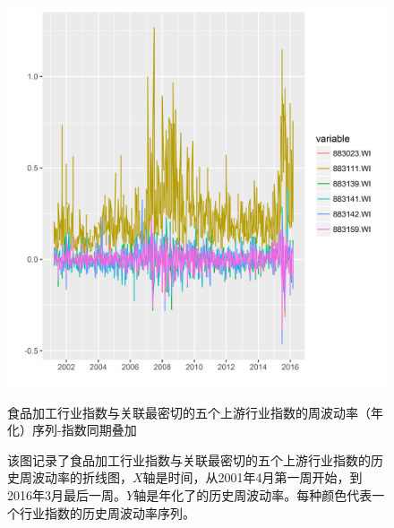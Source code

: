 \documentclass{sysuthesis}
\begin{document}
\begin{figure}[htbp]
\centering
\includegraphics[scale=0.8]{image/883111-topk-upper-plus-one-weeklyvol-combined.png}
\caption{食品加工行业指数与关联最密切的五个上游行业指数的周波动率（年化）序列-指数同期叠加}
\caption*{\footnotesize 该图记录了食品加工行业指数与关联最密切的五个上游行业指数的历史周波动率的折线图，$X$轴是时间，从2001年4月第一周开始，到2016年3月最后一周。$Y$轴是年化了的历史周波动率。每种颜色代表一个行业指数的历史周波动率序列。}
\label{fig:883111-topk-upper-plus-one-weeklyvol-combined}
\end{figure}
\end{document}
